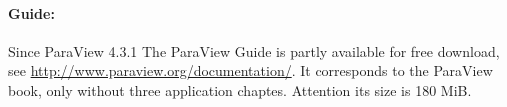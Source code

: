 \paragraph{Guide:}
Since ParaView 4.3.1 The ParaView Guide is partly
available for free download, see \url{http://www.paraview.org/documentation/}.
It corresponds to the ParaView book, only without three application chaptes.
Attention its size is 180 MiB.
